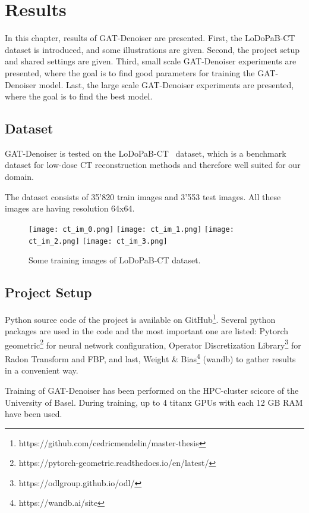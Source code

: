 \chapter{Results}
\label{sec:results}

In this chapter, results of GAT-Denoiser are presented.
First, the LoDoPaB-CT dataset is introduced, and some illustrations are given.
Second, the project setup and shared settings are given.
Third, small scale GAT-Denoiser experiments are presented, where the goal is to find
good parameters for training the GAT-Denoiser model.
Last, the large scale GAT-Denoiser experiments are presented, where the goal is 
to find the best model.



\section{Dataset}
GAT-Denoiser is tested on the LoDoPaB-CT~\cite{lodopab-dataset} dataset, which is a 
benchmark dataset for low-dose CT reconstruction methods and therefore well suited for our domain.

The dataset consists of 35'820 train images and 3'553 test images.
All these images are having resolution 64x64.

\begin{figure}[H]
  \centering
  \hfill
  \texttt{[image: ct\_im\_0.png]}
  \hfill
  \texttt{[image: ct\_im\_1.png]}
  \hfill
  \texttt{[image: ct\_im\_2.png]}
  \hfill
  \texttt{[image: ct\_im\_3.png]}
  \hfill
  \caption{Some training images of LoDoPaB-CT dataset.}
\end{figure}



\section{Project Setup}
Python source code of the project is available on GitHub\footnote{https://github.com/cedricmendelin/master-thesis}.
Several python packages are used in the code and the most important one are listed: Pytorch geometric\footnote{https://pytorch-geometric.readthedocs.io/en/latest/} 
for neural network configuration, Operator Discretization Library\footnote{https://odlgroup.github.io/odl/} for Radon Transform and FBP, 
and last, Weight \& Bias\footnote{https://wandb.ai/site} (wandb) to gather results in a convenient way.

Training of GAT-Denoiser has been performed on the HPC-cluster scicore of the University of Basel.
During training, up to 4 titanx GPUs with each 12 GB RAM have been used.


